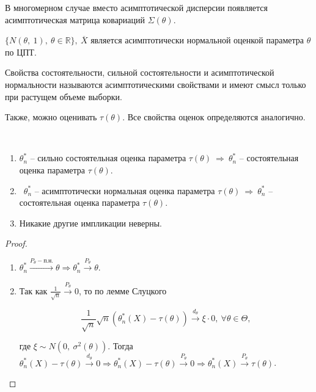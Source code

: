 \begin{note}
В многомерном случае вместо асимптотической дисперсии появляется асимптотическая матрица ковариаций $\displaystyle \Sigma ( \theta )$.
\end{note}
\begin{example}
$\displaystyle \{N( \theta,\ 1),\ \theta \in \mathbb{R}\},\ \overline{X}$ является асимптотически нормальной оценкой параметра $\displaystyle \theta $ по ЦПТ.
\end{example}
\begin{note}
Свойства состоятельности, сильной состоятельности и асимптотической нормальности называются асимптотическими свойствами и имеют смысл только при растущем объеме выборки.
\end{note}
\begin{note}
Также, можно оценивать $\displaystyle \tau ( \theta )$. Все свойства оценок определяются аналогично.
\end{note}
\begin{theorem} \
\begin{enumerate}
    \item $\displaystyle \theta _{n}^{*}$ -- сильно состоятельная оценка параметра $\displaystyle \tau ( \theta )$$\displaystyle\ \Rightarrow\ $$\displaystyle \theta _{n}^{*}$ -- состоятельная оценка параметра $\displaystyle \tau ( \theta )$.
    
    \item \ $\displaystyle \theta _{n}^{*}$ -- асимптотически нормальная оценка параметра $\displaystyle \tau ( \theta )$$\displaystyle\ \Rightarrow\ $$\displaystyle \theta _{n}^{*}$ -- состоятельная оценка параметра $\displaystyle \tau ( \theta )$.
    
    \item Никакие другие импликации неверны.
\end{enumerate}

\end{theorem}
\begin{proof} \
\begin{enumerate}
    \item $\displaystyle \theta _{n}^{*}\xrightarrow{P_{\theta } -\text{п.н.}} \theta \Rightarrow \theta _{n}^{*}\xrightarrow{P_{\theta }} \theta $.
    
    \item Так как $\displaystyle \frac{1}{\sqrt{n}}\xrightarrow{P_{\theta }} 0$, то по лемме Слуцкого

\begin{equation*}
\frac{1}{\sqrt{n}}\sqrt{n}\left( \theta _{n}^{*}( X) -\tau ( \theta )\right)\xrightarrow{d_{\theta }} \xi \cdotp 0,\ \forall \theta \in \Theta ,
\end{equation*}

где $\displaystyle \xi \sim N\left( 0,\ \sigma ^{2}( \theta )\right)$. Тогда $\displaystyle \theta _{n}^{*}( X) -\tau ( \theta )\xrightarrow{d_{\theta }} 0\Rightarrow \theta _{n}^{*}( X) -\tau ( \theta )\xrightarrow{P_{\theta }} 0\Rightarrow \theta _{n}^{*}( X)\xrightarrow{P_{\theta }} \tau ( \theta )$.
\end{enumerate}
\end{proof}

